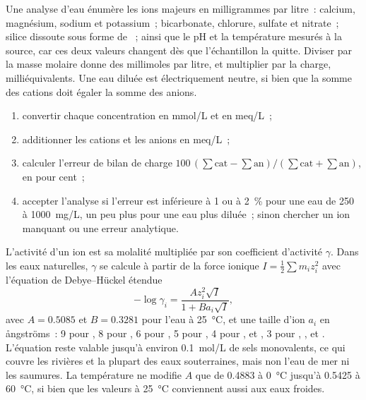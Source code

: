 Une analyse d'eau énumère les ions majeurs en milligrammes par litre~: calcium,
magnésium, sodium et potassium~; bicarbonate, chlorure, sulfate et nitrate~;
silice dissoute sous forme de ~; ainsi que le pH et la température mesurés à la
source, car ces deux valeurs changent dès que l'échantillon la quitte. Diviser par la masse
molaire donne des millimoles par litre, et multiplier par la charge,
milliéquivalents. Une eau diluée est électriquement neutre, si bien que la somme des
cations doit égaler la somme des anions.

\begin{method}\label{met:b3:water-rock-interaction:analysis}
\begin{enumerate}
\item convertir chaque concentration en \unit{mmol/L} et en \unit{meq/L}~;
\item additionner les cations et les anions en \unit{meq/L}~;
\item calculer l'erreur de bilan de charge $100\,(\sum\text{cat} -
  \sum\text{an})/(\sum\text{cat} + \sum\text{an})$, en pour cent~;
\item accepter l'analyse si l'erreur est inférieure à 1 ou à \qty{2}{\percent} pour une
  eau de 250 à \qty{1000}{mg/L}, un peu plus pour une eau plus diluée~;
  sinon chercher un ion manquant ou une erreur analytique.
\end{enumerate}
\end{method}

L'activité d'un ion est sa molalité multipliée par son coefficient d'activité
$\gamma$. Dans les eaux naturelles, $\gamma$ se calcule à partir de la force ionique $I =
\tfrac12\sum m_i z_i^2$ avec l'équation de Debye--Hückel étendue
\[
-\log\gamma_i = \frac{A z_i^2\sqrt I}{1 + B a_i\sqrt I},
\]
avec $A = 0.5085$ et $B = 0.3281$ pour l'eau à \qty{25}{\celsius}, et une
taille d'ion $a_i$ en ångströms~: 9 pour , 8 pour , 6 pour
, 5 pour , 4 pour ,  et ,
3 pour , ,  et . L'équation reste valable jusqu'à
environ \qty{0.1}{mol/L} de sels monovalents, ce qui couvre les rivières et la plupart des
eaux souterraines, mais non l'eau de mer ni les saumures. La température ne modifie $A$ que de
0.4883 à \qty{0}{\celsius} jusqu'à 0.5425 à \qty{60}{\celsius}, si bien que les valeurs à
\qty{25}{\celsius} conviennent aussi aux eaux froides.

